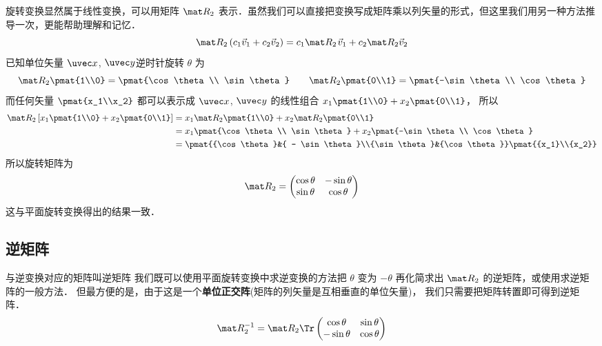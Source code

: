 
旋转变换显然属于线性变换，可以用矩阵 $\mat R_2$ 表示．虽然我们可以直接把变换写成矩阵乘以列矢量的形式，但这里我们用另一种方法推导一次，更能帮助理解和记忆．
\begin{equation}
\mat R_2\left( {{c_1}{{\vec v}_1} + {c_2}{{\vec v}_2}} \right) = {c_1}\mat R_2{\kern 1pt} {\vec v_1} + {c_2}\mat R_2 {\vec v_2} 
\end{equation}
已知单位矢量 $\uvec x$, $\uvec y$逆时针旋转 $\theta$ 为
\begin{equation}
\mat R_2\pmat{1\\0} = \pmat{\cos \theta \\ \sin \theta}
\qquad
\mat R_2\pmat{0\\1} = \pmat{-\sin\theta \\ \cos\theta}
\end{equation}
而任何矢量 $\pmat{x_1\\x_2}$ 都可以表示成 $\uvec x$, $\uvec y$ 的线性组合 ${x_1}\pmat{1\\0} + {x_2}\pmat{0\\1}$， 所以
\begin{equation}\begin{split}
\mat R_2\left[x_1 \pmat{1\\0} + x_2 \pmat{0\\1} \right] 
&= x_1 \mat R_2\pmat{1\\0} + x_2 \mat R_2\pmat{0\\1}\\
&= x_1\pmat{\cos \theta \\ \sin \theta} 
  + x_2 \pmat{-\sin\theta \\ \cos\theta} \\
&= \pmat{{\cos \theta }&{ - \sin \theta }\\{\sin \theta }&{\cos \theta }}
\pmat{{x_1}\\{x_2}}
\end{split}\end{equation}
所以旋转矩阵为
\begin{equation}
\mat R_2 = \begin{pmatrix}
{\cos\theta }&{ - \sin\theta }\\
{\sin\theta }&{\cos\theta }
\end{pmatrix}
\end{equation}
这与平面旋转变换得出的结果一致．
\subsection{逆矩阵}
与逆变换对应的矩阵叫逆矩阵%
我们既可以使用平面旋转变换中求逆变换的方法把 $\theta$ 变为 $-\theta$ 再化简求出 $\mat R_2$ 的逆矩阵，或使用求逆矩阵的一般方法．%
但最方便的是，由于这是一个\textbf{单位正交阵}(矩阵的列矢量是互相垂直的单位矢量)，%
我们只需要把矩阵转置即可得到逆矩阵．
\begin{equation}
\mat R_2^{-1} = \mat R_2\Tr \begin{pmatrix}
{\cos\theta }&{\sin\theta }\\
{-\sin\theta }&{\cos\theta }
\end{pmatrix}
\end{equation}

